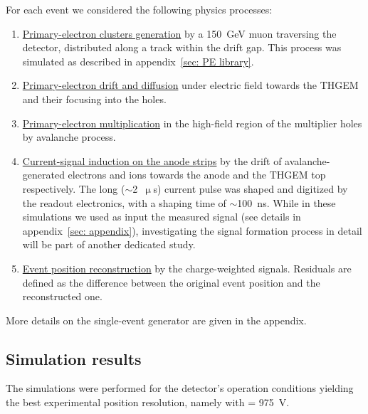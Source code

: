 For each event we considered the following physics processes:
\begin{enumerate}
\item \underline{Primary-electron clusters generation} by a 150~GeV muon traversing the detector, distributed along a track within the drift gap. This process was simulated as described in appendix~\ref{sec: PE library}.
\item \underline{Primary-electron drift and diffusion} under electric field towards the THGEM and their focusing into the holes. 
\item \underline{Primary-electron multiplication} in the high-field region of the multiplier holes by avalanche process. 
\item \underline{Current-signal induction on the anode strips} by the drift of avalanche-generated electrons and ions towards the anode and the THGEM top respectively. 
The long ($\sim$2~$\upmu$s) current pulse was shaped and digitized by the readout electronics, with a shaping time of $\sim$100~ns. While in these simulations we used as input the measured signal (see details in appendix~\ref{sec: appendix}), investigating the signal formation process in detail will be part of another dedicated study.
\item \underline{Event position reconstruction} by the charge-weighted signals. Residuals are defined as the difference between the original event position and the reconstructed one.
\end{enumerate}

More details on the single-event generator are given in the appendix. 

\subsection{Simulation results}
\label{sec: simulation results}

The simulations were performed for the detector's operation conditions yielding the best experimental position resolution, namely with \dvrpwell= 975~V.

